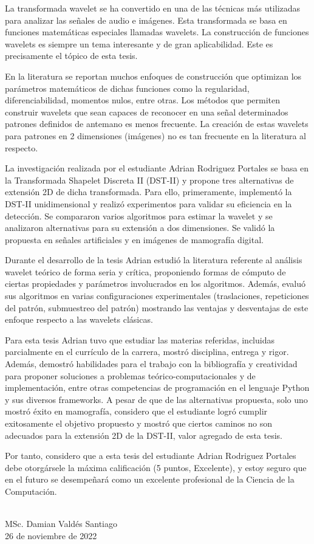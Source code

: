 \begin{opinion}
	La transformada wavelet se ha convertido en una de las técnicas más utilizadas para analizar las señales de audio e imágenes. Esta transformada se basa en funciones matemáticas especiales llamadas wavelets. La construcción de funciones wavelets es siempre un tema interesante y de gran aplicabilidad. Este es precisamente el tópico de esta tesis.

	En la literatura se reportan muchos enfoques de construcción que optimizan los parámetros matemáticos de dichas funciones como la regularidad, diferenciabilidad, momentos nulos, entre otras. Los métodos que permiten construir wavelets que sean capaces de reconocer en una señal determinados patrones definidos de antemano es menos frecuente. La creación de estas wavelets para patrones en 2 dimensiones (imágenes) no es tan frecuente en la literatura al respecto.

	La investigación realizada por el estudiante Adrian Rodriguez Portales se basa en la Transformada Shapelet Discreta II (DST-II) y propone tres alternativas de extensión 2D de dicha transformada. Para ello, primeramente, implementó la DST-II unidimensional y realizó experimentos para validar su eficiencia en la detección. Se compararon varios algoritmos para estimar la wavelet y se analizaron alternativas para su extensión a dos dimensiones. Se validó la propuesta en señales artificiales y en imágenes de mamografía digital. 

	Durante el desarrollo de la tesis Adrian estudió la literatura referente al análisis wavelet teórico de forma seria y crítica, proponiendo formas de cómputo de ciertas propiedades y parámetros involucrados en los algoritmos. Además, evaluó sus algoritmos en varias configuraciones experimentales (traslaciones, repeticiones del patrón, submuestreo del patrón) mostrando las ventajas y desventajas de este enfoque respecto a las wavelets clásicas. 

	Para esta tesis Adrian tuvo que estudiar las materias referidas, incluidas parcialmente en el currículo de la carrera, mostró disciplina, entrega y rigor. Además, demostró habilidades para el trabajo con la bibliografía y creatividad para proponer soluciones a problemas teórico-computacionales y de implementación, entre otras competencias de programación en el lenguaje Python y sus diversos frameworks. A pesar de que de las alternativas propuesta, solo uno mostró éxito en mamografía, considero que el estudiante logró cumplir exitosamente el objetivo propuesto y mostró que ciertos caminos no son adecuados para la extensión 2D de la DST-II, valor agregado de esta tesis.

	Por tanto, considero que a esta tesis del estudiante Adrian Rodriguez Portales debe otorgársele la máxima calificación (5 puntos, Excelente), y estoy seguro que en el futuro se desempeñará como un excelente profesional de la Ciencia de la Computación.

	\hspace*{\fill}\\
	\hspace*{\fill} MSc. Damian Valdés Santiago\\
    \hspace*{\fill} 26 de noviembre de 2022
\end{opinion}
